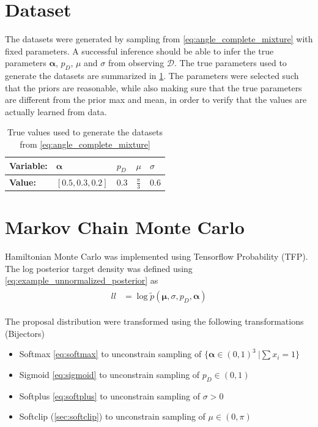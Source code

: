 \section{Dataset}
The datasets were generated by sampling from \cref{eq:angle_complete_mixture} with fixed parameters. A successful inference should be able to infer the true parameters $\boldsymbol{\alpha}$, $p_D$, $\mu$ and $\sigma$ from observing $\mathcal{D}$.
The true parameters used to generate the datasets are summarized in \cref{tbl:example_params}. The parameters were selected such that the priors are reasonable, while also making sure that the true parameters are different from the prior max and mean, in order to verify that the values are actually learned from data. 
\begin{table}[h!]
\centering
\begin{tabular}{lllll}
\textbf{Variable:}   & $\boldsymbol{\alpha}$ & $p_D$ & $\mu$                  & $\sigma$         \\ \hline
\textbf{Value:} & $[0.5, 0.3, 0.2]$     & $0.3$ & $\frac{\pi}{3}$ & $0.6$ \\
\end{tabular}
\caption{True values used to generate the datasets from \cref{eq:angle_complete_mixture}}
\label{tbl:example_params}
\end{table}

\section{Markov Chain Monte Carlo}
Hamiltonian Monte Carlo was implemented using Tensorflow Probability (TFP). The log posterior target density was defined using \cref{eq:example_unnormalized_posterior} as 
\begin{align}\label{eq:example_ll}
\begin{split}
    ll &= \log \tilde{p}(\boldsymbol{\mu}, \sigma, p_D, \boldsymbol{\alpha})
\end{split}
\end{align}


The proposal distribution were transformed using the following transformations (Bijectors)

\begin{itemize}
\item Softmax \eqref{eq:softmax} to unconstrain sampling of $\{\boldsymbol{\alpha} \in (0, 1)^3\ | \sum x_i = 1\}$
\item Sigmoid \eqref{eq:sigmoid} to unconstrain sampling of $p_D \in (0, 1)$
\item Softplus \eqref{eq:softplus} to unconstrain sampling of $\sigma > 0$
\item Softclip (\cref{sec:softclip}) to unconstrain sampling of $\mu \in (0, \pi)$
\end{itemize}

